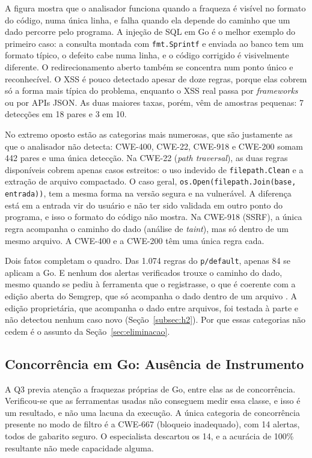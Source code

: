 A figura mostra que o analisador funciona quando a fraqueza é visível no formato do código, numa única linha, e falha quando ela depende do caminho que um dado percorre pelo programa. A injeção de SQL em Go é o melhor exemplo do primeiro caso: a consulta montada com \texttt{fmt.Sprintf} e enviada ao banco tem um formato típico, o defeito cabe numa linha, e o código corrigido é visivelmente diferente. O redirecionamento aberto também se concentra num ponto único e reconhecível. O XSS é pouco detectado apesar de doze regras, porque elas cobrem só a forma mais típica do problema, enquanto o XSS real passa por \textit{frameworks} ou por APIs JSON. As duas maiores taxas, porém, vêm de amostras pequenas: 7 detecções em 18 pares e 3 em 10.

{\sloppy No extremo oposto estão as categorias mais numerosas, que são justamente as que o analisador não detecta: CWE-400, CWE-22, CWE-918 e CWE-200 somam 442 pares e uma única detecção. Na CWE-22 (\textit{path traversal}), as duas regras disponíveis cobrem apenas casos estreitos: o uso indevido de \texttt{filepath.Clean} e a extração de arquivo compactado. O caso geral, \texttt{os.Open(filepath.Join(base, entrada))}, tem a mesma forma na versão segura e na vulnerável. A diferença está em a entrada vir do usuário e não ter sido validada em outro ponto do programa, e isso o formato do código não mostra. Na CWE-918 (SSRF), a única regra acompanha o caminho do dado (análise de \textit{taint}), mas só dentro de um mesmo arquivo. A CWE-400 e a CWE-200 têm uma única regra cada.\par}

Dois fatos completam o quadro. Das 1.074 regras do \texttt{p/default}, apenas 84 se aplicam a Go. E nenhum dos alertas verificados trouxe o caminho do dado, mesmo quando se pediu à ferramenta que o registrasse, o que é coerente com a edição aberta do Semgrep, que só acompanha o dado dentro de um arquivo \cite{semgrepdocs}. A edição proprietária, que acompanha o dado entre arquivos, foi testada à parte e não detectou nenhum caso novo (Seção~\ref{subsec:h2}). Por que essas categorias não cedem é o assunto da Seção~\ref{sec:eliminacao}.

\subsection{Concorrência em Go: Ausência de Instrumento}
\label{subsec:q3concorrencia}

A Q3 previa atenção a fraquezas próprias de Go, entre elas as de concorrência. Verificou-se que as ferramentas usadas não conseguem medir essa classe, e isso é um resultado, e não uma lacuna da execução. A única categoria de concorrência presente no modo de filtro é a CWE-667 (bloqueio inadequado), com 14 alertas, todos de gabarito seguro. O especialista descartou os 14, e a acurácia de 100\% resultante não mede capacidade alguma.

